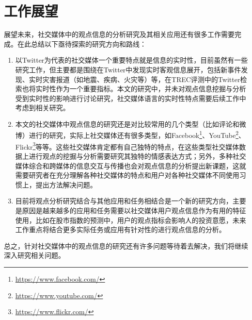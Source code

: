 \section{工作展望}
展望未来，社交媒体中的观点信息的分析研究及其相关应用还有很多工作需要完成。在此总结以下亟待探索的研究方向和路线：
  \begin{enumerate}
  \item 以Twitter为代表的社交媒体一个重要特点就是信息的实时性，目前虽然有一些研究工作，但主要都是围绕在Twitter中发现实时客观信息展开，包括新事件发现、实时灾害报道（如地震、疾病、火灾等）等，在TREC评测中的Twitter检索也将实时性作为一个重要指标。本文的研究中，并未对观点信息挖掘与分析受到实时性的影响进行讨论研究，社交媒体语言的实时性特点需要后续工作中考虑到相关研究。
  
 \item 本文的社交媒体中观点信息的研究还是对比较常用的几个类型（比如评论和微博）进行的研究，实际上社交媒体还有很多类型，如Facebook\footnote{\url{https://www.facebook.com/}}、YouTube\footnote{\url{https://www.youtube.com/}}、 Flickr\footnote{\url{https://www.flickr.com/}}等等。这些社交媒体肯定都有自己独特的特点，在这些类型社交媒体数据上进行观点的挖掘与分析需要研究其独特的情感表达方式；另外，多种社交媒体综合和跨媒体的信息交互与传播也会对观点信息的分析提出新课题，这就需要研究者在充分理解各种社交媒体的特点和用户对各种社交媒体不同使用习惯上，提出方法解决问题。
 
 \item 目前将观点分析研究结合与其他应用和任务相结合是一个新的研究方向，主要是原因是越来越多的应用和任务需要以社交媒体用户观点信息作为有用的特征使用，比如在股市指数的预测中，用户的观点指标会影响人的投资意愿，未来工作重点将结合更多实际任务或应用有针对性的进行观点信息的分析。
  \end{enumerate}
  
总之，针对社交媒体中的观点信息的研究还有许多问题等待着去解决，我们将继续深入研究相关问题。

\newpage 
\mbox{} 
\newpage